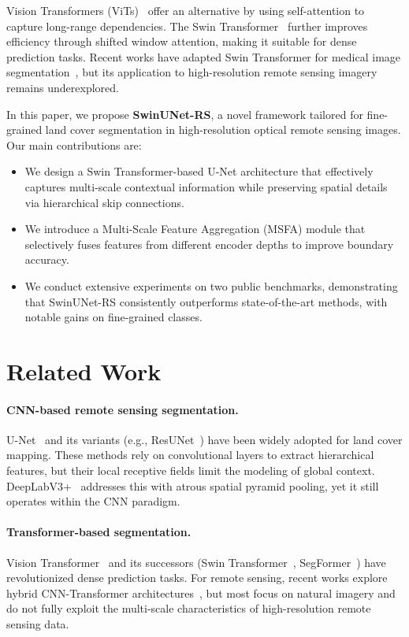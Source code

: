\documentclass[conference]{IEEEtran}
\begin{document}
Vision Transformers (ViTs)~\cite{dosovitskiy2020vit} offer an alternative by using self-attention
to capture long-range dependencies. The Swin Transformer~\cite{liu2021swin} further improves
efficiency through shifted window attention, making it suitable for dense prediction tasks.
Recent works have adapted Swin Transformer for medical image segmentation~\cite{cao2022swinunet},
but its application to high-resolution remote sensing imagery remains underexplored.

In this paper, we propose \textbf{SwinUNet-RS}, a novel framework tailored for
fine-grained land cover segmentation in high-resolution optical remote sensing images.
Our main contributions are:
\begin{itemize}
    \item We design a Swin Transformer-based U-Net architecture that effectively captures
    multi-scale contextual information while preserving spatial details via hierarchical skip connections.
    \item We introduce a Multi-Scale Feature Aggregation (MSFA) module that selectively fuses
    features from different encoder depths to improve boundary accuracy.
    \item We conduct extensive experiments on two public benchmarks, demonstrating that
    SwinUNet-RS consistently outperforms state-of-the-art methods, with notable gains
    on fine-grained classes.
\end{itemize}

\section{Related Work}\label{sec:related}

\paragraph{CNN-based remote sensing segmentation.}
U-Net~\cite{ronneberger2015unet} and its variants (e.g., ResUNet~\cite{zhang2018resunet})
have been widely adopted for land cover mapping. These methods rely on convolutional layers
to extract hierarchical features, but their local receptive fields limit the modeling of
global context. DeepLabV3+~\cite{chen2018deeplabv3plus} addresses this with atrous spatial pyramid pooling,
yet it still operates within the CNN paradigm.

\paragraph{Transformer-based segmentation.}
Vision Transformer~\cite{dosovitskiy2020vit} and its successors (Swin Transformer~\cite{liu2021swin},
SegFormer~\cite{xie2021segformer}) have revolutionized dense prediction tasks.
For remote sensing, recent works explore hybrid CNN-Transformer architectures~\cite{wang2022unetformer},
but most focus on natural imagery and do not fully exploit the multi-scale characteristics
of high-resolution remote sensing data.
\end{document}
